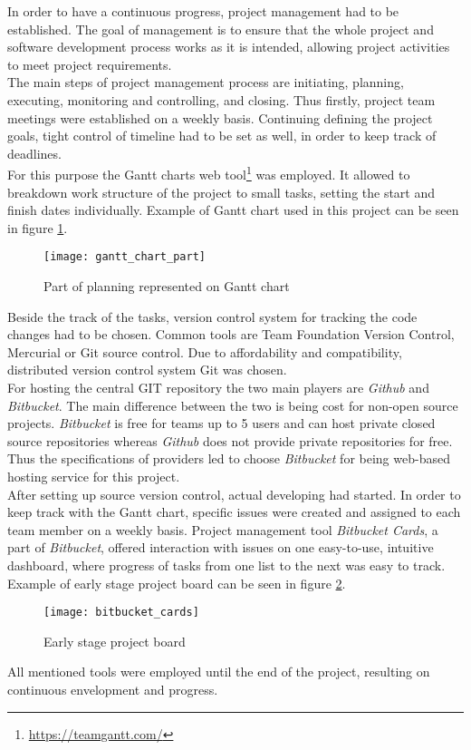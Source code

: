 In order to have a continuous progress, project management had to be established. The goal of management is to ensure that the whole project and software development process works as it is intended, allowing project activities to meet project requirements.
\\
The main steps of project management process are initiating, planning, executing, monitoring and controlling, and closing. Thus firstly, project team meetings were established on a weekly basis. Continuing defining the project goals, tight control of timeline had to be set as well, in order to keep track of deadlines.
\\
For this purpose the Gantt charts web tool\footnote{\url{https://teamgantt.com/}} was employed. It allowed to breakdown work structure of the project to small tasks, setting the start and finish dates individually. Example of Gantt chart used in this project can be seen in figure \ref{fig:gannt_example}.

\begin{figure}[ht!]
	\centering
	\texttt{[image: gantt\_chart\_part]}
	\caption{Part of planning represented on Gantt chart}
	\label{fig:gannt_example}
\end{figure}

Beside the track of the tasks, version control system for tracking the code changes had to be chosen. Common tools are Team Foundation Version Control, Mercurial or Git source control. Due to affordability and compatibility, distributed version control system Git was chosen. 
\\
For hosting the central GIT repository the two main players are \textit{Github} and \textit{Bitbucket}.
The main difference between the two is being cost for non-open source projects. \textit{Bitbucket} is free for teams up to 5 users and can host private closed source repositories whereas \textit{Github} does not provide private repositories for free. Thus the specifications of providers led to choose \textit{Bitbucket} for being web-based hosting service for this project.
\\
After setting up source version control, actual developing had started. In order to keep track with the Gantt chart, specific issues were created and assigned to each team member on a weekly basis. Project management tool \textit{Bitbucket Cards}, a part of \textit{Bitbucket}, offered interaction with issues on one easy-to-use, intuitive dashboard, where progress of tasks from one list to the next was easy to track.  Example of early stage project board can be seen in figure \ref{fig:bitcards}.

\begin{figure}[ht!]
	\centering
	\texttt{[image: bitbucket\_cards]}
	\caption{Early stage project board}
	\label{fig:bitcards}
\end{figure}

All mentioned tools were employed until the end of the project, resulting on continuous envelopment and progress.